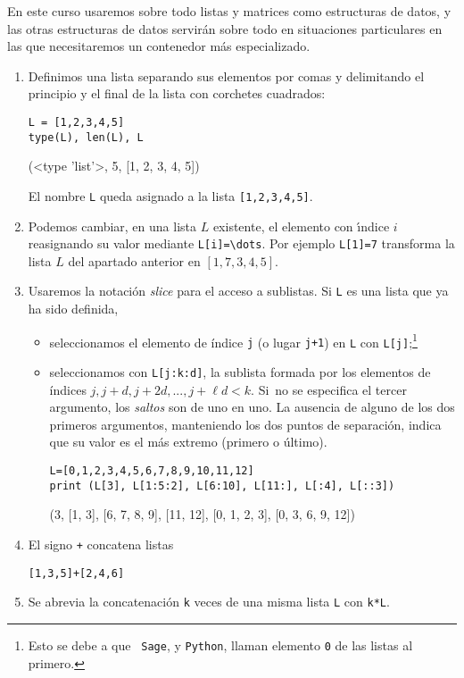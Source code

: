 En este curso {\sc usaremos sobre todo listas y matrices} como estructuras de
datos, y las otras estructuras de datos servir\'an sobre todo en situaciones
particulares en las que necesitaremos un contenedor m\'as especializado.


\begin{enumerate}
 \item Definimos una lista separando sus elementos por comas y delimitando el
principio y
el final de la lista con corchetes cuadrados:
\begin{lstlisting}[numbers=none]
L = [1,2,3,4,5]
type(L), len(L), L
\end{lstlisting}
\begin{Output}
	(<type 'list'>, 5, [1, 2, 3, 4, 5])
\end{Output}

El nombre \lstinline|L| queda asignado a la lista \lstinline|[1,2,3,4,5]|. 
\item Podemos cambiar, en una lista $L$ existente, el elemento con \'{\i}ndice
$i$ reasignando su valor mediante \lstinline|L[i]=\dots|. Por ejemplo
\lstinline|L[1]=7| transforma la lista
$L$ del apartado anterior en $[1,7,3,4,5]$.
\item Usaremos la notación \emph{slice} 
para el acceso a sublistas. Si \lstinline|L| es una lista que ya ha sido
definida, 
\begin{itemize}
 \item seleccionamos el elemento de índice {\tt j} (o lugar {\tt j+1}) en
\lstinline|L|
con \lstinline|L[j]|;\footnote{Esto se debe a que {\tt
Sage}, y {\tt Python},  llaman elemento {\tt 0} de las listas al primero.}

\item seleccionamos con \lstinline|L[j:k:d]|, la sublista formada por los
elementos de
índices $j,j+d,j+2d,..., j+\ell d<k$. Si~no se
especifica el tercer argumento, los \emph{saltos} son de uno en uno. La ausencia
de
alguno de los dos primeros argumentos, manteniendo los dos
puntos de separación, indica que su valor es el más extremo (primero o último).
\begin{lstlisting}
L=[0,1,2,3,4,5,6,7,8,9,10,11,12]
print (L[3], L[1:5:2], L[6:10], L[11:], L[:4], L[::3])
\end{lstlisting}
\begin{Output}
	(3, [1, 3], [6, 7, 8, 9], [11, 12], [0, 1, 2, 3], [0, 3, 6, 9, 12])
\end{Output}
\end{itemize}
\item El signo \lstinline|+| concatena listas
\begin{lstlisting}
[1,3,5]+[2,4,6] 
\end{lstlisting}
\begin{Output}
	[1, 3, 5, 2, 4, 6]
\end{Output}

\item Se abrevia la concatenación  \lstinline|k| veces de una misma lista
\lstinline|L|
con \lstinline|k*L|. 


\end{enumerate}

